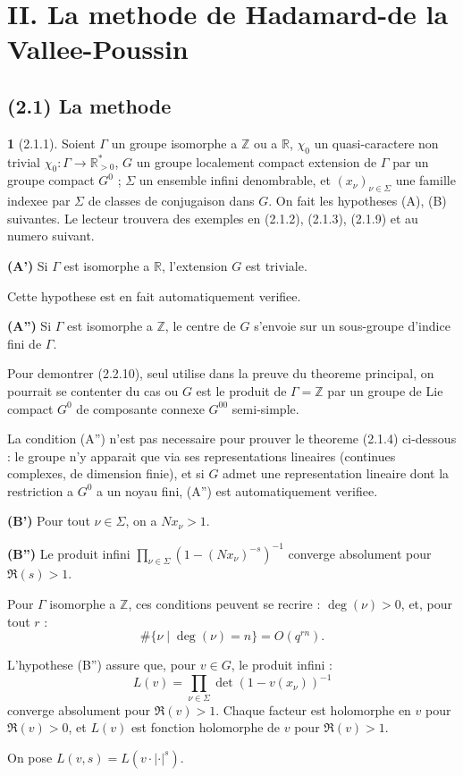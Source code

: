 \documentclass[12pt,a4paper]{article}
\theoremstyle{plain}
\theoremstyle{definition}
\theoremstyle{definition}
\newtheorem{para}{}[section]
\theoremstyle{remark}
\begin{document}
\newpage

\section*{II. La methode de Hadamard-de la Vallee-Poussin}

\subsection*{(2.1) La methode}

\begin{para}[2.1.1]
Soient $\Gamma$ un groupe isomorphe a $\mathbb{Z}$ ou a $\mathbb{R}$, $\chi_0$ un quasi-caractere non trivial $\chi_0: \Gamma \to \mathbb{R}_{>0}^*$, $G$ un groupe localement compact extension de $\Gamma$ par un groupe compact $G^0$ ; $\Sigma$ un ensemble infini denombrable, et $(x_\nu)_{\nu \in \Sigma}$ une famille indexee par $\Sigma$ de classes de conjugaison dans $G$. On fait les hypotheses (A), (B) suivantes. Le lecteur trouvera des exemples en (2.1.2), (2.1.3), (2.1.9) et au numero suivant.

\textbf{(A')} Si $\Gamma$ est isomorphe a $\mathbb{R}$, l'extension $G$ est triviale.

Cette hypothese est en fait automatiquement verifiee.

\textbf{(A'')} Si $\Gamma$ est isomorphe a $\mathbb{Z}$, le centre de $G$ s'envoie sur un sous-groupe d'indice fini de $\Gamma$.

Pour demontrer (2.2.10), seul utilise dans la preuve du theoreme principal, on pourrait se contenter du cas ou $G$ est le produit de $\Gamma = \mathbb{Z}$ par un groupe de Lie compact $G^0$ de composante connexe $G^{00}$ semi-simple.

La condition (A'') n'est pas necessaire pour prouver le theoreme (2.1.4) ci-dessous : le groupe n'y apparait que via ses representations lineaires (continues complexes, de dimension finie), et si $G$ admet une representation lineaire dont la restriction a $G^0$ a un noyau fini, (A'') est automatiquement verifiee.

\textbf{(B')} Pour tout $\nu \in \Sigma$, on a $Nx_\nu > 1$.

\textbf{(B'')} Le produit infini $\prod_{\nu \in \Sigma} (1 - (Nx_\nu)^{-s})^{-1}$ converge absolument pour $\Re(s) > 1$.

Pour $\Gamma$ isomorphe a $\mathbb{Z}$, ces conditions peuvent se recrire : $\deg(\nu) > 0$, et, pour tout $r$ :
\[\#\{\nu \mid \deg(\nu) = n\} = O(q^{rn}).\]

L'hypothese (B'') assure que, pour $v \in G$, le produit infini :
\[L(v) = \prod_{\nu \in \Sigma} \det(1 - v(x_\nu))^{-1}\]
converge absolument pour $\Re(v) > 1$. Chaque facteur est holomorphe en $v$ pour $\Re(v) > 0$, et $L(v)$ est fonction holomorphe de $v$ pour $\Re(v) > 1$.

On pose $L(v, s) = L(v \cdot |\cdot|^s)$.
\end{para}
\end{document}
